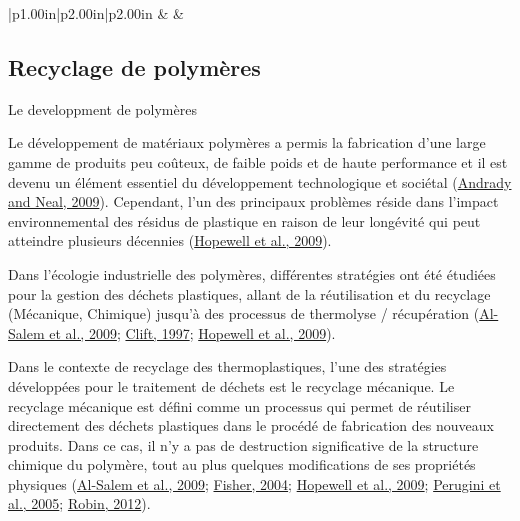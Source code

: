 \documentclass[
]{article}
\begin{document}
\begin{longtable}[c]{|p{1.00in}|p{2.00in}|p{2.00in}}
 &  &  \\



\end{longtable}

\hypertarget{recyclage-de-polymuxe8res}{%
\subsection{Recyclage de polymères}\label{recyclage-de-polymuxe8res}}

Le developpment de polymères

Le développement de matériaux polymères a permis la fabrication d'une large gamme de produits peu coûteux, de faible poids et de haute performance et il est devenu un élément essentiel du développement technologique et sociétal (\protect\hyperlink{ref-Andrady2009}{Andrady and Neal, 2009}).
Cependant, l'un des principaux problèmes réside dans l'impact environnemental des résidus de plastique en raison de leur longévité qui peut atteindre plusieurs décennies (\protect\hyperlink{ref-Hopewell2009}{Hopewell et al., 2009}).

Dans l'écologie industrielle des polymères, différentes stratégies ont été étudiées pour la gestion des déchets plastiques, allant de la réutilisation et du recyclage (Mécanique, Chimique) jusqu'à des processus de thermolyse / récupération (\protect\hyperlink{ref-AlSalem2009}{Al-Salem et al., 2009}; \protect\hyperlink{ref-Clift1997}{Clift, 1997}; \protect\hyperlink{ref-Hopewell2009}{Hopewell et al., 2009}).

Dans le contexte de recyclage des thermoplastiques, l'une des stratégies développées pour le traitement de déchets est le recyclage mécanique.
Le recyclage mécanique est défini comme un processus qui permet de réutiliser directement des déchets plastiques dans le procédé de fabrication des nouveaux produits. Dans ce cas, il n'y a pas de destruction significative de la structure chimique du polymère, tout au plus quelques modifications de ses propriétés physiques (\protect\hyperlink{ref-AlSalem2009}{Al-Salem et al., 2009}; \protect\hyperlink{ref-Fisher2004}{Fisher, 2004}; \protect\hyperlink{ref-Hopewell2009}{Hopewell et al., 2009}; \protect\hyperlink{ref-Perugini2005}{Perugini et al., 2005}; \protect\hyperlink{ref-Robin2012}{Robin, 2012}).
\end{document}
